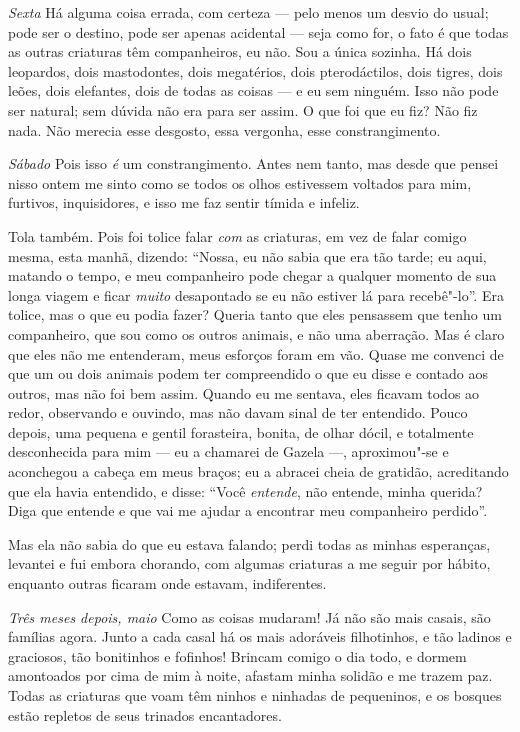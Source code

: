 \textit{Sexta} Há alguma coisa errada, com certeza --- pelo menos um desvio do usual; pode ser
o destino, pode ser apenas acidental --- seja como for, o fato é que todas as outras
criaturas têm companheiros, eu não. Sou a única sozinha. Há dois leopardos, dois mastodontes,
dois megatérios, dois pterodáctilos, dois tigres, dois leões, dois elefantes, dois de todas as coisas
--- e eu sem ninguém. Isso não pode ser natural; sem dúvida não era para ser assim. O que
foi que eu fiz? Não fiz nada. Não merecia esse desgosto, essa vergonha, esse constrangimento.

\textit{Sábado} Pois isso \textit{é} um constrangimento. Antes nem tanto, mas desde que pensei nisso
ontem me sinto como se todos os olhos estivessem voltados para mim, furtivos, inquisidores,
e isso me faz sentir tímida e infeliz.

Tola também. Pois foi tolice falar \textit{com} as criaturas, em vez de falar comigo mesma, esta manhã,
dizendo: ``Nossa, eu não sabia que era tão tarde; eu aqui, matando o tempo, e meu companheiro pode chegar
a qualquer momento de sua longa viagem e ficar \textit{muito} desapontado se eu não estiver lá para recebê"-lo''.
Era tolice, mas o que eu podia fazer? Queria tanto que eles pensassem que tenho um companheiro,
que sou como os outros animais, e não uma aberração. Mas é claro que eles não me entenderam, meus
esforços foram em vão. Quase me convenci de que um ou dois animais podem ter compreendido
o que eu disse e contado aos outros, mas não foi bem assim. Quando eu me sentava, eles ficavam todos ao
redor, observando e ouvindo, mas não davam sinal de ter entendido. Pouco depois,
uma pequena e gentil forasteira, bonita, de olhar dócil, e totalmente desconhecida para mim --- eu a chamarei
de Gazela ---, aproximou"-se e aconchegou a cabeça em meus braços; eu a abracei cheia
de gratidão, acreditando que ela havia entendido, e disse: ``Você \textit{entende}, não entende, minha
querida? Diga que entende e que vai me ajudar a encontrar meu companheiro perdido''.

Mas ela não sabia do que eu estava falando; perdi todas as minhas esperanças, levantei e fui
embora chorando, com algumas criaturas a me seguir por hábito, enquanto outras ficaram onde estavam,
indiferentes.

\textit{Três meses depois, maio} Como as coisas mudaram! Já não são mais casais, são famílias agora.       
Junto a cada casal há os mais adoráveis filhotinhos, e tão ladinos e graciosos, tão bonitinhos e fofinhos!
Brincam comigo o dia todo, e dormem amontoados por cima de mim à noite, afastam minha solidão
e me trazem paz. Todas as criaturas que voam têm ninhos e ninhadas de pequeninos, e os bosques
estão repletos de seus trinados encantadores.

